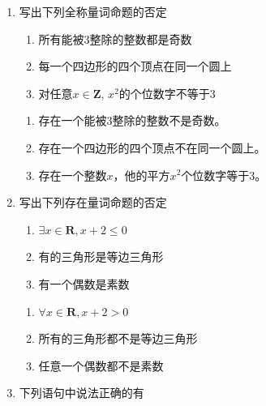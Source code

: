 \begin{enumerate}
    \item 写出下列全称量词命题的否定
    \begin{enumerate}
        \item 所有能被3整除的整数都是奇数
        \item 每一个四边形的四个顶点在同一个圆上
        \item 对任意$x \in \mathbf{Z}$, $x^2$的个位数字不等于3
    \end{enumerate}
    \begin{jieda}
        \begin{enumerate}
            \item 存在一个能被3整除的整数不是奇数。
            \item 存在一个四边形的四个顶点不在同一个圆上。
            \item 存在一个整数$x$，他的平方$x^2$个位数字等于3。
        \end{enumerate}
    \end{jieda}
    \item 写出下列存在量词命题的否定
    \begin{enumerate}
        \item $\exists x \in \mathbf{R}, x+2 \leq 0$
        \item 有的三角形是等边三角形
        \item 有一个偶数是素数
    \end{enumerate}
    \begin{jieda}
        \begin{enumerate}
            \item $\forall x \in \mathbf{R}, x + 2 > 0$
            \item 所有的三角形都不是等边三角形
            \item 任意一个偶数都不是素数
        \end{enumerate}
    \end{jieda}
    
    \item 下列语句中说法正确的有

\end{enumerate}
    

